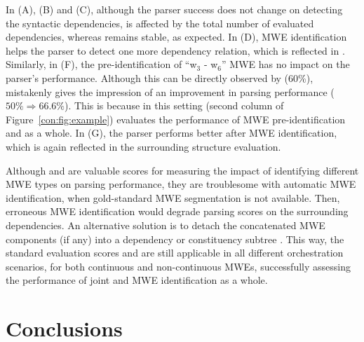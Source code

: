 \documentclass[output=paper]{langsci/langscibook}
\begin{document}
In (A), (B) and (C), although the parser success does not change on detecting the syntactic dependencies, \asuo{} is affected by the total number of evaluated dependencies, whereas \asus{} remains stable, as expected.
In (D), MWE identification helps the parser to detect one more dependency relation, which is reflected in \asus{}.
Similarly, in (F), the pre-identification of  ``w$_3$ - w$_6$'' MWE has no impact on the parser's performance.
Although this can be directly observed by \asus{} (60\%), \asuo{} mistakenly gives the impression of an improvement in parsing performance ($50\%\Rightarrow66.6\%$). This is because  in this setting (second column of Figure~\ref{con:fig:example})
\asuo{} evaluates the performance of MWE pre-identification and  as a whole.
In (G), the parser performs better after MWE identification, which is again reflected in the surrounding structure evaluation.

Although \asus{} and \asls{} are valuable scores for measuring the impact of identifying different MWE types on parsing performance, they are troublesome with automatic MWE identification, when gold-standard MWE segmentation is not available. Then, erroneous MWE identification would degrade parsing scores on the surrounding dependencies.
An alternative solution is to detach the concatenated MWE components (if any) into a dependency or constituency subtree \citep{candito2014strategies,eryigit:2011:multiword}. This way, the standard evaluation scores \asu{} and \asl{} are still applicable in all different orchestration scenarios, for both continuous and non-continuous MWEs, successfully assessing the performance of joint  and MWE identification as a whole.

%
\section{Conclusions}
\label{con:sec:conclusions}
\end{document}
